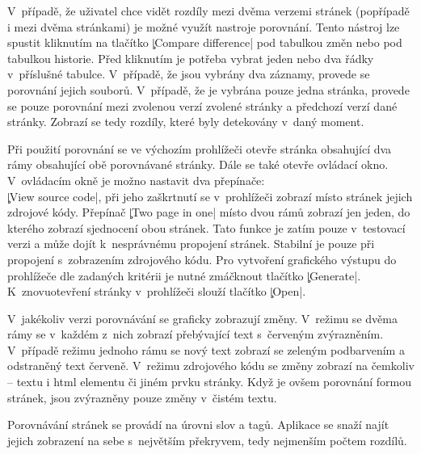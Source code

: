 V~případě, že uživatel chce vidět rozdíly mezi dvěma verzemi stránek (popřípadě i mezi dvěma stránkami) je možné využít nastroje porovnání.
Tento nástroj lze spustit kliknutím na tlačítko \c|Compare difference| pod tabulkou změn nebo pod tabulkou historie.
Před kliknutím je potřeba vybrat jeden nebo dva řádky v~příslušné tabulce.
V~případě, že jsou vybrány dva záznamy, provede se porovnání jejich souborů.
V~případě, že je vybrána pouze jedna stránka, provede se pouze porovnání mezi zvolenou verzí zvolené stránky a předchozí verzí dané stránky.
Zobrazí se tedy rozdíly, které byly detekovány v~daný moment.

Při použití porovnání se ve výchozím prohlížeči otevře stránka obsahující dva rámy obsahující obě porovnávané stránky.
Dále se také otevře ovládací okno.
V~ovládacím okně je možno nastavit dva přepínače:\\
\c|View source code|, při jeho zaškrtnutí se v~prohlížeči zobrazí místo stránek jejich zdrojové kódy.
Přepínač \c|Two page in one| místo dvou rámů zobrazí jen jeden, do kterého zobrazí sjednocení obou stránek.
Tato funkce je zatím pouze v~testovací verzi a může dojít k~nesprávnému propojení stránek. Stabilní je pouze při propojení s~zobrazením zdrojového kódu.
Pro vytvoření grafického výstupu do prohlížeče dle zadaných kritérii je nutné zmáčknout tlačítko \c|Generate|.
K~znovuotevření stránky v~prohlížeči slouží tlačítko \c|Open|.

V~jakékoliv verzi porovnávání se graficky zobrazují změny.
V~režimu se dvěma rámy se v~každém z~nich zobrazí přebývající text s~červeným zvýrazněním.
V~případě režimu jednoho rámu se nový text zobrazí se zeleným podbarvením a odstraněný text červeně.
V~režimu zdrojového kódu se změny zobrazí na čemkoliv -- textu i html elementu či jiném prvku stránky.
Když je ovšem porovnání formou stránek, jsou zvýrazněny pouze změny v~čistém textu.

Porovnávání stránek se provádí na úrovni slov a tagů.
Aplikace se snaží najít jejich zobrazení na sebe s~největším překryvem,  tedy nejmenším počtem rozdílů.
